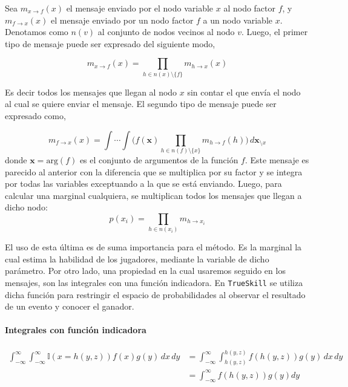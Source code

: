 \documentclass[11pt,twoside,spanish]{report} %
\begin{document}
Sea $m_{x \rightarrow f}(x)$ el mensaje enviado por el nodo variable $x$ al nodo factor $f$, y $m_{f \rightarrow x}(x)$ el mensaje enviado por un nodo factor $f$ a un nodo variable $x$.
Denotamos como $n(v)$ al conjunto de nodos vecinos al nodo $v$.
Luego, el primer tipo de mensaje puede ser expresado del siguiente modo,

\begin{equation}\label{eq:m_v_f}
m_{x \rightarrow f}(x) = \prod_{h \in n(x) \setminus \{f\} } m_{h \rightarrow x}(x)
\end{equation}

Es decir todos los mensajes que llegan al nodo $x$ sin contar el que env\'ia el nodo al cual se quiere enviar el mensaje.
El segundo tipo de mensaje puede ser expresado como,

\begin{equation}\label{eq:m_f_v}
m_{f \rightarrow x}(x) = \int \cdots \int \Big( f(\bm{x}) \prod_{h \in n(f) \setminus \{x\} } m_{h \rightarrow f}(h) \Big) \,  d\bm{x}_{\setminus x}
\end{equation}
donde $\bm{x} = \text{arg}(f)$ es el conjunto de argumentos de la funci\'on $f$.
Este mensaje es parecido al anterior con la diferencia que se multiplica por su factor y se integra por todas las variables exceptuando a la que se est\'a enviando.
Luego, para calcular una marginal cualquiera, se multiplican todos los mensajes que llegan a dicho nodo:
\begin{equation}\label{eq:marginal}
p(x_i) = \prod_{h \in n(x_i)} m_{h \rightarrow x_i}
\end{equation}

El uso de esta \'ultima es de suma importancia para el m\'etodo.
Es la marginal la cual estima la habilidad de los jugadores, mediante la variable de dicho par\'ametro.
Por otro lado, una propiedad en la cual usaremos seguido en los mensajes, son las integrales con una funci\'on indicadora.
En \texttt{TrueSkill} se utiliza dicha funci\'on para restringir el espacio de probabilidades al observar el resultado de un evento y conocer el ganador.

\paragraph{Integrales con funci\'on indicadora}
\begin{equation}\label{eq:integral_con_indicadora}
\begin{split}
\int_{-\infty}^{\infty}  \int_{-\infty}^{\infty}  \mathbb{I}(x=h(y,z)) f(x) g(y)\, dx\, dy &=  \int_{-\infty}^{\infty} \int_{h(y,z)}^{h(y,z)} f(h(y,z)) g(y)\, dx\, dy\\
& = \int_{-\infty}^{\infty} f(h(y,z)) g(y) dy
\end{split}
\end{equation}
\end{document}
